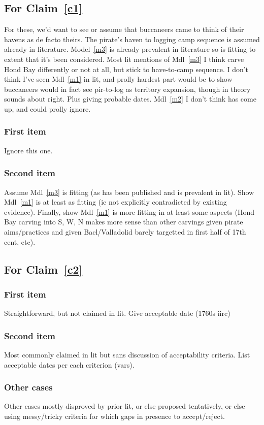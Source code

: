\documentclass{amsart}
\theoremstyle{definition}%
\theoremstyle{definition}%
\begin{document}
\subsection{For Claim~\ref{c1}}
%
For these, we'd want to see or assume that buccaneers came to think of their havens as de facto theirs. The pirate's haven to logging camp sequence is assumed already in literature. Model~\ref{m3} is already prevalent in literature so is fitting to extent that it's been considered. Most lit mentions of Mdl~\ref{m3} I think carve Hond Bay differently or not at all, but stick to have-to-camp sequence. I don't think I've seen Mdl~\ref{m1} in lit, and prolly hardest part would be to show buccaneers would in fact see pir-to-log as territory expansion, though in theory sounds about right. Plus giving probable dates. Mdl~\ref{m2} I don't think has come up, and could prolly ignore.
%
\subsubsection{First item} Ignore this one.
\subsubsection{Second item} Assume Mdl~\ref{m3} is fitting (as has been published and is prevalent in lit). Show Mdl~\ref{m1} is at least as fitting (ie not explicitly contradicted by existing evidence). Finally, show Mdl~\ref{m1} is more fitting in at least some aspects (Hond Bay carving into S, W, N makes more sense than other carvings given pirate aims/practices and given Bacl/Valladolid barely targetted in first half of 17th cent, etc).
%
%
\subsection{For Claim~\ref{c2}}
\subsubsection{First item} Straightforward, but not claimed in lit. Give acceptable date (1760s iirc)
\subsubsection{Second item} Most commonly claimed in lit but sans discussion of acceptability criteria. List acceptable dates per each criterion (vars).
\subsubsection{Other cases} Other cases mostly disproved by prior lit, or else proposed tentatively, or else using messy/tricky criteria for which gaps in presence to accept/reject.
%
%
\end{document}
